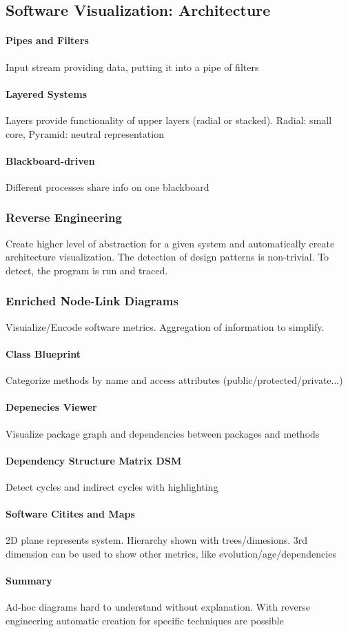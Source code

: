 \documentclass[10pt,a4paper]{article}
\begin{document}
	\subsection{Software Visualization: Architecture}
	\paragraph{Pipes and Filters} Input stream providing data, putting it into a pipe of filters
	\paragraph{Layered Systems} Layers provide functionality of upper layers (radial or stacked). Radial: small core, Pyramid: neutral representation 
	\paragraph{Blackboard-driven} Different processes share info on one blackboard
	\subsubsection{Reverse Engineering}
	Create higher level of abstraction for a given system and automatically create architecture visualization. The detection of design patterns is non-trivial. To detect, the program is run and traced. 
	\subsubsection{Enriched Node-Link Diagrams} 
	Visuialize/Encode software metrics. Aggregation of information to simplify.
	\paragraph{Class Blueprint}
	Categorize methods by name and access attributes (public/protected/private...)
	\paragraph{Depenecies Viewer}
	Visualize package graph and dependencies between packages and methods
	\paragraph{Dependency Structure Matrix DSM}
	Detect cycles and indirect cycles with highlighting
	\paragraph{Software Citites and Maps}
	2D plane represents system. Hierarchy shown with trees/dimesions. 3rd dimension can be used to show other metrics, like evolution/age/dependencies
	\paragraph{Summary}
	Ad-hoc diagrams hard to understand without explanation. With reverse engineering automatic creation for specific techniques are possible 
		
\end{document}
